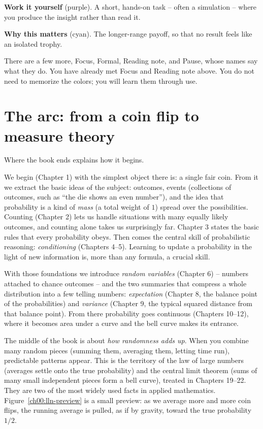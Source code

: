 \begin{labbox}
\textbf{Work it yourself} (purple). A short, hands-on task -- often a
simulation -- where you produce the insight rather than read it.
\end{labbox}

\begin{aestheticbox}
\textbf{Why this matters} (cyan). The longer-range payoff, so that no result
feels like an isolated trophy.
\end{aestheticbox}

There are a few more, \textsf{Focus}, \textsf{Formal}, \textsf{Reading note},
and \textsf{Pause}, whose names say what they do. You have already met
\textsf{Focus} and \textsf{Reading note} above. You do not need to memorize
the colors; you will learn them through use.

\section*{The arc: from a coin flip to measure theory}
\label{ch00:arc}

Where the book ends explains how it begins.

We begin (Chapter 1) with the simplest object there is: a single fair
coin. From it we extract the basic ideas of the subject:
outcomes, events (collections of outcomes, such as ``the die shows an even
number''), and the idea that probability is a kind of \emph{mass} (a total weight of $1$) spread over
the possibilities. Counting (Chapter 2) lets us handle situations with many equally
likely outcomes, and counting alone takes us surprisingly far. Chapter 3 states
the basic rules that every probability obeys. Then comes the
central skill of probabilistic reasoning: \emph{conditioning} (Chapters 4--5).
Learning to update a probability in the light of new information is, more than
any formula, a crucial skill.

With those foundations we introduce \emph{random variables} (Chapter 6) --
numbers attached to chance outcomes -- and the two summaries that compress a
whole distribution into a few telling numbers: \emph{expectation} (Chapter 8,
the balance point of the probabilities) and \emph{variance} (Chapter 9, the
typical squared distance from that balance point). From there probability goes
continuous (Chapters 10--12), where it becomes area under a curve and the bell
curve makes its entrance.

The middle of the book is about \emph{how randomness adds up}. When you combine
many random pieces (summing them, averaging them, letting time run), predictable
patterns appear. This is the territory of the law of large
numbers (averages settle onto the true probability) and the central limit
theorem (sums of many small independent pieces form a bell curve), treated in
Chapters 19--22. They are two of the most widely used facts in applied mathematics.
Figure~\ref{ch00:lln-preview} is a small preview: as we average more and more
coin flips, the running average is pulled, as if by gravity, toward the true
probability $1/2$.

